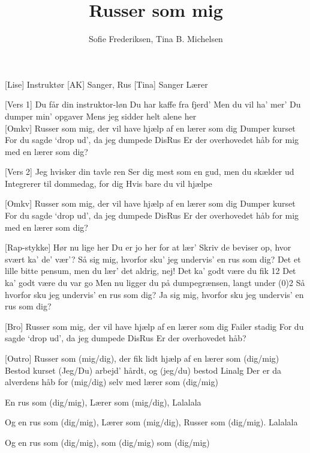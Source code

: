 \documentclass[a4paper,11pt]{article}
\title{Russer som mig}
\author{Sofie Frederiksen, Tina B. Michelsen}
\begin{document}
\maketitle

\begin{roles}
[Lise] Instruktør
[AK] Sanger, Rus
[Tina] Sanger Lærer 
\end{roles}

\begin{song}
   [Vers 1]	Du får din instruktor-løn
						Du har kaffe fra fjerd’
						Men du vil ha’ mer’
						Du dumper min’ opgaver
						Mens jeg sidder helt alene her\\
 [Omkv]		Russer som mig, der vil have hjælp af en lærer som dig
						Dumper kurset
						For du sagde ‘drop ud’, da jeg dumpede DisRus
						Er der overhovedet håb for mig med en lærer som dig?

 [Vers 2]		Jeg hvisker din tavle ren
						Ser dig mest som en gud, men du skælder ud
						Integrerer til dommedag, for dig
						Hvis bare du vil hjælpe
				
 [Omkv]		Russer som mig, der vil have hjælp af en lærer som dig
						Dumper kurset
						For du sagde ‘drop ud’, da jeg dumpede DisRus
						Er der overhovedet håb for mig med en lærer som dig?


  [Rap-stykke] Hør nu lige her
						Du er jo her for at lær’ 
						Skriv de beviser op, hvor svært ka’ de’ vær’?
						Så sig mig, hvorfor sku’ jeg undervis’ en rus som dig? 
						Det et lille bitte pensum, men du lær’ det aldrig, nej! 
						Det ka’ godt være du fik 12
						Det ka’ godt være du var go
						Men nu ligger du på dumpegrænsen, langt under (0)2
						Så hvorfor sku jeg undervis’ en rus som dig?
						Ja sig mig, hvorfor sku jeg undervis’ en rus som dig?
						
						
 [Bro] 		Russer som mig, der vil have hjælp af en lærer som dig
						Failer stadig
						For du sagde ‘drop ud’, da jeg dumpede DisRus
						Er der overhovedet håb?
						
[Outro]		Russer som (mig/dig), der fik lidt hjælp af en lærer som (dig/mig)
						Bestod kurset
						(Jeg/Du) arbejd’ hårdt, og (jeg/du) bestod Linalg
						Der er da alverdens håb for (mig/dig) selv med lærer som (dig/mig)

 			En rus som (dig/mig), 
						Lærer som (mig/dig), 
						Lalalala 
						
						Og en rus som (dig/mig), 
						Lærer som (mig/dig), 
						Russer som (dig/mig). 
						Lalalala 

						Og en rus som (dig/mig), 
						som (dig/mig) 
						som (dig/mig)

\end{song}
\end{document}
